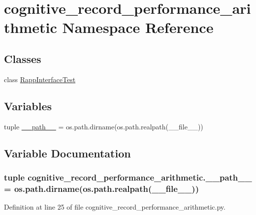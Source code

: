 \hypertarget{namespacecognitive__record__performance__arithmetic}{\section{cognitive\-\_\-record\-\_\-performance\-\_\-arithmetic Namespace Reference}
\label{namespacecognitive__record__performance__arithmetic}
}
\subsection*{Classes}
\begin{DoxyCompactItemize}
\item 
class \hyperlink{classcognitive__record__performance__arithmetic_1_1RappInterfaceTest}{Rapp\-Interface\-Test}
\end{DoxyCompactItemize}
\subsection*{Variables}
\begin{DoxyCompactItemize}
\item 
tuple \hyperlink{namespacecognitive__record__performance__arithmetic_a42f81331be5ab62033220e97bf0cc096}{\-\_\-\-\_\-path\-\_\-\-\_\-} = os.\-path.\-dirname(os.\-path.\-realpath(\-\_\-\-\_\-file\-\_\-\-\_\-))
\end{DoxyCompactItemize}


\subsection{Variable Documentation}
\hypertarget{namespacecognitive__record__performance__arithmetic_a42f81331be5ab62033220e97bf0cc096}{
\subsubsection[{\-\_\-\-\_\-path\-\_\-\-\_\-}]{\setlength{\rightskip}{0pt plus 5cm}tuple cognitive\-\_\-record\-\_\-performance\-\_\-arithmetic.\-\_\-\-\_\-path\-\_\-\-\_\- = os.\-path.\-dirname(os.\-path.\-realpath(\-\_\-\-\_\-file\-\_\-\-\_\-))}}\label{namespacecognitive__record__performance__arithmetic_a42f81331be5ab62033220e97bf0cc096}


Definition at line 25 of file cognitive\-\_\-record\-\_\-performance\-\_\-arithmetic.\-py.

